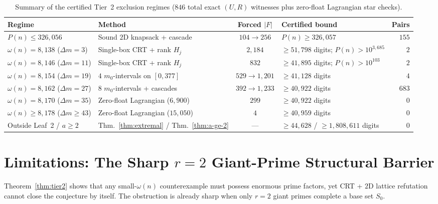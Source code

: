 \documentclass[11pt]{article}
\theoremstyle{remark}
\begin{document}
\begin{table}[t]
\centering
\caption{Summary of the certified Tier~2 exclusion regimes ($846$ total exact
$(U,R)$ witnesses plus zero-float Lagrangian star checks).}
\label{tab:tier2}
\footnotesize
\setlength{\tabcolsep}{4.5pt}
\begin{tabular}{llcl r}
\toprule
Regime & Method & Forced $|F|$ & Certified bound & Pairs \\
\midrule
$P(n) \le 326{,}056$ & Sound $2$D knapsack + cascade & $104 \to 256$ & $P(n) \ge 326{,}057$ & $155$ \\
$\omega(n) = 8{,}138$ ($\Delta m=3$) & Single-box CRT + rank $H_j$ & $2{,}184$ & $\ge 51{,}798$ digits; $P(n) > 10^{3{,}685}$ & $2$ \\
$\omega(n) = 8{,}146$ ($\Delta m=11$) & Single-box CRT + rank $H_j$ & $832$ & $\ge 41{,}895$ digits; $P(n) > 10^{103}$ & $2$ \\
$\omega(n) = 8{,}154$ ($\Delta m=19$) & $4$ $m_0$-intervals on $[0,377]$ & $529 \to 1{,}201$ & $\ge 41{,}128$ digits & $4$ \\
$\omega(n) = 8{,}162$ ($\Delta m=27$) & $8$ $m_0$-intervals + cascades & $392 \to 1{,}233$ & $\ge 40{,}922$ digits & $683$ \\
$\omega(n) = 8{,}170$ ($\Delta m=35$) & Zero-float Lagrangian ($6{,}900$) & $299$ & $\ge 40{,}922$ digits & $0$ \\
$\omega(n) \ge 8{,}178$ ($\Delta m\ge 43$) & Zero-float Lagrangian ($15{,}050$) & $4$ & $\ge 40{,}959$ digits & $0$ \\
\midrule
Outside Leaf~2 / $a \ge 2$ & Thm.~\ref{thm:extremal} / Thm.~\ref{thm:a-ge-2} & --- & $\ge 44{,}628$ / $\ge 1{,}808{,}611$ digits & $0$ \\
\bottomrule
\end{tabular}
\end{table}

\section{Limitations: The Sharp \texorpdfstring{$r=2$}{r = 2} Giant-Prime Structural Barrier}
\label{sec:barrier}

Theorem~\ref{thm:tier2} shows that any small-$\omega(n)$ counterexample must
possess enormous prime factors, yet CRT + $2$D lattice refutation cannot close
the conjecture by itself. The obstruction is already sharp when only $r = 2$
giant primes complete a base set $S_0$.
\end{document}
